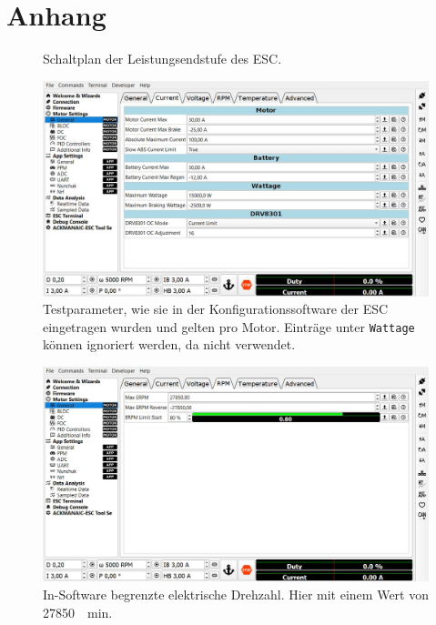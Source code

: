 \appendix
\chapter{Anhang}
	\begin{figure}[h]
		\centering
		
		\caption[Schaltplan der Leistungsendstufe des ESC]{Schaltplan der Leistungsendstufe des ESC\cite{vesc.documentation.2015}.}%
		\label{fig:power mosfets}
	\end{figure}
	\newpage
	\begin{figure}[h]
		\centering
		\includegraphics[width=\textwidth]{Assets/ESC_Motor_Parameters.jpg}
		\caption[Testparameter, wie sie in der Konfigurationssoftware der ESC eingetragen wurden]{Testparameter, wie sie in der Konfigurationssoftware der ESC eingetragen wurden und gelten pro Motor. Einträge unter \texttt{Wattage} können ignoriert werden, da nicht verwendet.}%
		\label{fig:ESC motor params}
	\end{figure}
	\begin{figure}[h]
		\centering
		\includegraphics[width=\textwidth]{Assets/ESC_erpm.jpg}
		\caption[In-Software begrenzte elektrische Drehzahl]{In-Software begrenzte elektrische Drehzahl. Hier mit einem Wert von \qty{27850}{\per\minute}.}%
		\label{fig:ESC erpm setting}
	\end{figure}
